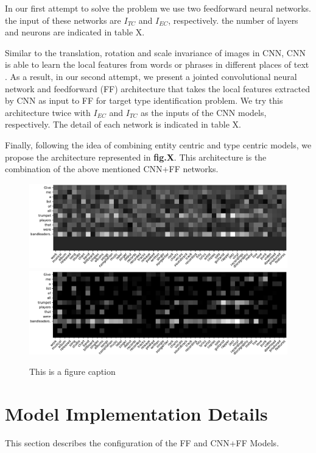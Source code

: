 In our first attempt to solve the problem we use two feedforward neural networks. the input of these networks are $I_{TC}$ and $I_{EC}$, respectively. the number of layers and neurons are indicated in table X.


Similar to the translation, rotation and scale invariance of images in CNN, CNN is able to learn the local features from words or phrases in different places of text \cite{wang2016combination}. As a result, in our second attempt, we present a jointed convolutional neural network and feedforward (FF) architecture that takes the local features extracted by CNN as input to FF for target type identification problem. We try this architecture twice with $I_{EC}$ and $I_{TC}$ as the inputs of the CNN models, respectively. The detail of each network is indicated in table X.

Finally, following the idea of combining entity centric and type centric models\cite{Balog:2011:QME:2037661.2037667,Garigliotti:2017:TTI:3077136.3080659}, we propose the architecture represented in \textbf{fig.X}. This architecture is the combination of the above mentioned CNN+FF networks.

\begin{figure}
	\includegraphics[width=\textwidth]{leaders_in_cropped.pdf}
	\includegraphics[width=\textwidth]{leaders_conv1_cropped.pdf}
	\caption{This is a figure caption}
\end{figure}

\section{Model Implementation Details}
This section describes the configuration of the FF and CNN+FF Models.


